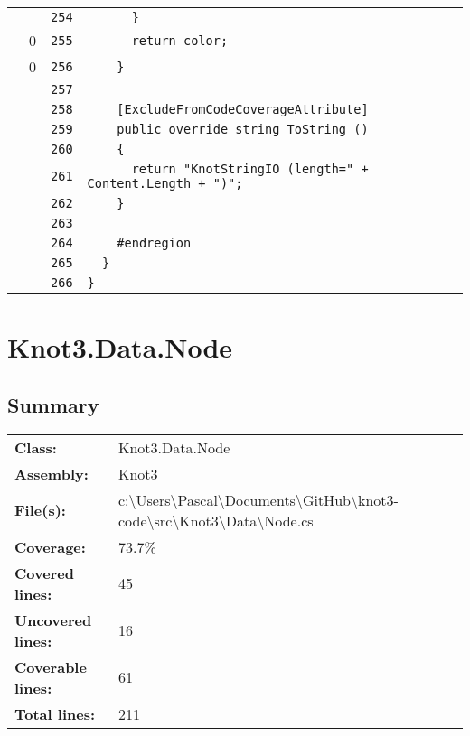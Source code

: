 \documentclass[a4paper,10pt]{article}
\begin{document}
\begin{longtable}[l]{lrrl}
\cellcolor{gray} &  & \verb~254~ & \verb~      }~\\
\cellcolor{red} & 0 & \verb~255~ & \verb~      return color;~\\
\cellcolor{red} & 0 & \verb~256~ & \verb~    }~\\
\cellcolor{gray} &  & \verb~257~ & \verb~~\\
\cellcolor{gray} &  & \verb~258~ & \verb~    [ExcludeFromCodeCoverageAttribute]~\\
\cellcolor{gray} &  & \verb~259~ & \verb~    public override string ToString ()~\\
\cellcolor{gray} &  & \verb~260~ & \verb~    {~\\
\cellcolor{gray} &  & \verb~261~ & \verb~      return "KnotStringIO (length=" + Content.Length + ")";~\\
\cellcolor{gray} &  & \verb~262~ & \verb~    }~\\
\cellcolor{gray} &  & \verb~263~ & \verb~~\\
\cellcolor{gray} &  & \verb~264~ & \verb~    #endregion~\\
\cellcolor{gray} &  & \verb~265~ & \verb~  }~\\
\cellcolor{gray} &  & \verb~266~ & \verb~}~\\
\end{longtable}
\newpage
\section{Knot3.Data.Node}
\subsection{Summary}
\begin{longtable}[l]{ll}
\textbf{Class:} & Knot3.Data.Node\\
\textbf{Assembly:} & Knot3\\
\textbf{File(s):} & \begin{minipage}[t]{12cm}{c:\textbackslash Users\textbackslash Pascal\textbackslash Documents\textbackslash GitHub\textbackslash knot3-code\textbackslash src\textbackslash Knot3\textbackslash Data\textbackslash Node.cs}\end{minipage} \\
\textbf{Coverage:} & 73.7\%\\
\textbf{Covered lines:} & 45\\
\textbf{Uncovered lines:} & 16\\
\textbf{Coverable lines:} & 61\\
\textbf{Total lines:} & 211\\
\end{longtable}
\end{document}
